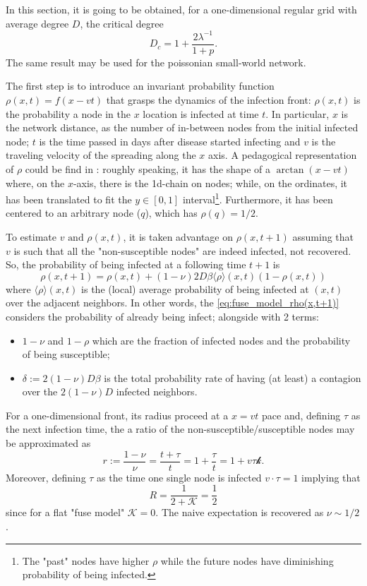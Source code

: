 \documentclass[a4paper,10pt,twoside]{book} %
\theoremstyle{definition}
\begin{document}
In this section, it is going to be obtained, for a one-dimensional regular grid with average degree $D$, the critical degree \cite{Thurner::NetBasedExpl} 
\begin{equation}
	D_c = 1 + \frac{2 \lambda^{-1}}{1+p}.
	\label{eq:Dc_PSW_network}
\end{equation}
The same result may be used for the poissonian small-world network.

The first step is to introduce an invariant probability function $\rho(x,t) = f(x-vt)$ that grasps the dynamics of the infection front: $\rho(x,t)$ is the probability a node in the $x$ location is infected at time $t$.
In particular, $x$ is the network distance, as the number of in-between nodes from the initial infected node; $t$ is the time passed in days after disease started infecting and $v$ is the traveling velocity of the spreading along the $x$ axis.
A pedagogical representation of $\rho$ could be find in \cite{Thurner::Appendix_NetBasedExpl}: roughly speaking, it has the shape of a $\arctan(x-vt)$ where, on the $x$-axis, there is the 1d-chain on  nodes; while, on the ordinates, it has been translated to fit the $y \in [0,1]$ interval\footnote{The "past" nodes have higher $\rho$ while the future nodes have diminishing probability of being infected.}.   Furthermore, it has been centered to an arbitrary node ($q$), which has $\rho(q) = 1/2$.

To estimate $v \text{ and } \rho(x,t)$, it is taken advantage on $\rho(x,t+1)$ assuming that $v$ is such that all the "non-susceptible nodes" are indeed infected, not recovered. So, the probability of being infected at a following time $t+1$ is
\begin{equation}
	\rho(x, t+1) = \rho(x,t)+(1-\nu)2D \beta \langle \rho \rangle(x,t) (1-\rho(x,t))
	\label{eq:fuse_model_rho(x,t+1)}
\end{equation}  
where $\langle \rho \rangle(x,t)$ is the (local) average probability of being infected at $(x,t)$ over the adjacent neighbors.
In other words, the \autoref{eq:fuse_model_rho(x,t+1)} considers the probability of already being infect; alongside with 2 terms:
\begin{itemize}
	\item $1-\nu$ and $1-\rho$ which are the fraction of infected nodes and the probability of being susceptible;
	\item $\delta:= 2(1-\nu)D \beta$ is the total probability rate of having (at least) a contagion over the $2(1-\nu)D$ infected neighbors.
\end{itemize}
For a one-dimensional front, its radius proceed at a $x=vt$ pace and, defining $\tau$ as the next infection time, the a ratio of the non-susceptible/susceptible nodes may be approximated as 
\begin{equation*}
	r:= \frac{1-\nu}{\nu} = \frac{t+\tau}{t} = 1+\frac{\tau}{t} = 1+v \tau \mathcal{k}.
\end{equation*}
Moreover, defining $\tau$ as the time one single node is infected $v \cdot \tau = 1$ implying that 
\[ R = \frac{1}{2+\mathcal{K}} = \frac{1}{2} \]
since for a flat "fuse model" $\mathcal{K} = 0$. 
The naive expectation is recovered as $\nu \sim 1/2$. 
\end{document}
